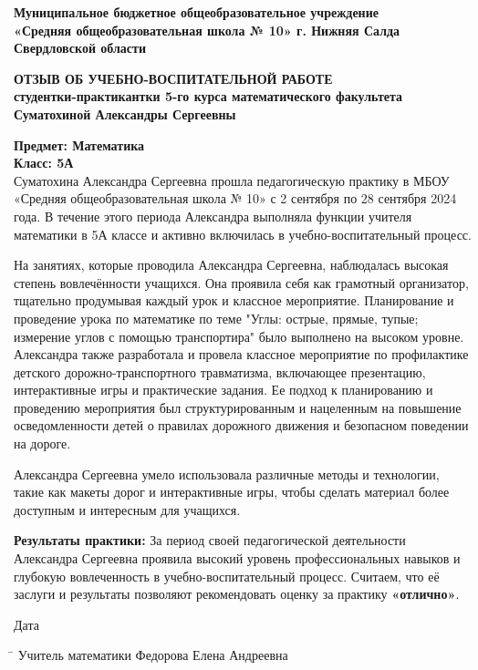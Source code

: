 \documentclass[a4paper,12pt]{article}
\begin{document}
\begin{center}
    \textbf{Муниципальное бюджетное общеобразовательное учреждение}\\
    \textbf{«Средняя общеобразовательная школа № 10» г. Нижняя Салда Свердловской области}\\
    \end{center}
\begin{center}
    \textbf{\large ОТЗЫВ ОБ УЧЕБНО-ВОСПИТАТЕЛЬНОЙ РАБОТЕ}\\
    \textbf{студентки-практикантки 5-го курса математического факультета}\\
    \textbf{Суматохиной Александры Сергеевны}
    \end{center}
\vspace{10mm}

\noindent
\textbf{Предмет: Математика}\\
\textbf{Класс: 5А}\\

Суматохина Александра Сергеевна прошла педагогическую практику в МБОУ «Средняя общеобразовательная школа № 10» с 2 сентября по 28 сентября 2024 года. В течение этого периода Александра выполняла функции учителя математики в 5А классе и активно включилась в учебно-воспитательный процесс.

На занятиях, которые проводила Александра Сергеевна, наблюдалась высокая степень вовлечённости учащихся. Она проявила себя как грамотный организатор, тщательно продумывая каждый урок и классное мероприятие. Планирование и проведение урока по математике по теме "Углы: острые, прямые, тупые; измерение углов с помощью транспортира" было выполнено на высоком уровне. Александра также разработала и провела классное мероприятие по профилактике детского дорожно-транспортного травматизма, включающее презентацию, интерактивные игры и практические задания. Ее подход к планированию и проведению мероприятия был структурированным и нацеленным на повышение осведомленности детей о правилах дорожного движения и безопасном поведении на дороге.

Александра Сергеевна умело использовала различные методы и технологии, такие как макеты дорог и интерактивные игры, чтобы сделать материал более доступным и интересным для учащихся.

\vspace{5mm}

\textbf{Результаты практики:} За период своей педагогической деятельности Александра Сергеевна проявила высокий уровень профессиональных навыков и глубокую вовлеченность в учебно-воспитательный процесс. Считаем, что её заслуги и результаты позволяют рекомендовать оценку за практику \textbf{«отлично»}.

\vspace{10mm}

\noindent
Дата \underline{\hspace{5cm}}
\begin{tabbing}
\hspace{4cm} \= \kill
Учитель математики \> \underline{\hspace{5cm}} Федорова Елена Андреевна
\end{tabbing}

\vspace{5mm}
\end{document}
